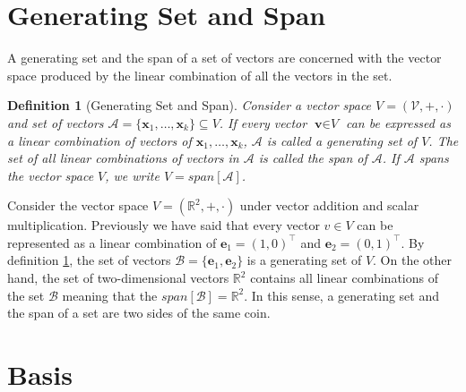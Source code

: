 \documentclass[a4paper,12pt]{article}
\newcommand{\set}[1]{\mathcal{#1}}
\newcommand{\vectr}[1]{\textbf{#1}}
\newcommand{\real}{\mathbb{R}}
\newcommand{\italic}[1]{\textit{#1}}
\newtheorem{definition}{Definition}[section]
\begin{document}
	\section{Generating Set and Span}
	
	A generating set and the span \cite[page 44]{mml_book} of a set of vectors are concerned with the vector space produced by the linear combination of all the vectors in the set.
	
	\begin{definition}[Generating Set and Span] \cite{def_generating_set_span}
		\normalfont Consider a vector space $\italic{V} = (\set{V}, +, \cdot)$ and set of vectors $\set{A} = \{\vectr{x}_1,\ldots,\vectr{x}_k\} \subseteq \italic{V}$. If every vector $\vectr{v} \in \italic{V}$ can be expressed as a linear combination of vectors of $\vectr{x}_1,\ldots,\vectr{x}_k$, $\set{A}$ is called a generating set of $\italic{V}$. The set of all linear combinations of vectors in $\set{A}$ is called the span of $\set{A}$. If $\set{A}$ spans the vector space $\italic{V}$, we write $\italic{V} = span[\set{A}]$. 
		\label{def:generating_set_span}
	\end{definition}
	
	Consider the vector space $ V = (\real^{2}, +, \cdot) $ under vector addition and scalar multiplication. Previously we have said that every vector $ v \in V $ can be represented as a linear combination of $\vectr{e}_1 = (1, 0)^{\top}$ and $\vectr{e}_2 = (0, 1)^{\top}$. By definition \ref{def:generating_set_span}, the set of vectors $ \set{B} = \{ \vectr{e}_1, \vectr{e}_2 \} $ is a generating set of $ V $. 
	On the other hand, the set of two-dimensional vectors $ \real^{2} $ contains all linear combinations of the set $ \set{B} $ meaning that the $ span[\set{B}] = \real^{2} $. In this sense, a generating set and the span of a set are two sides of the same coin.
	\section{Basis}
	
\end{document}
